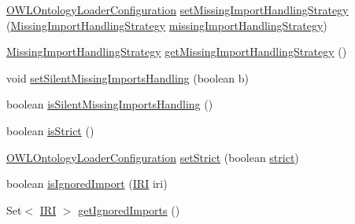 \begin{DoxyCompactItemize}
\item 
\hyperlink{classorg_1_1semanticweb_1_1owlapi_1_1model_1_1_o_w_l_ontology_loader_configuration}{O\-W\-L\-Ontology\-Loader\-Configuration} \hyperlink{classorg_1_1semanticweb_1_1owlapi_1_1model_1_1_o_w_l_ontology_loader_configuration_adfc53f1cb328fdd6aea34edfc6c8e2bf}{set\-Missing\-Import\-Handling\-Strategy} (\hyperlink{enumorg_1_1semanticweb_1_1owlapi_1_1model_1_1_missing_import_handling_strategy}{Missing\-Import\-Handling\-Strategy} \hyperlink{classorg_1_1semanticweb_1_1owlapi_1_1model_1_1_o_w_l_ontology_loader_configuration_a31378553cdc28a0a8143f6eca4579e2d}{missing\-Import\-Handling\-Strategy})
\item 
\hyperlink{enumorg_1_1semanticweb_1_1owlapi_1_1model_1_1_missing_import_handling_strategy}{Missing\-Import\-Handling\-Strategy} \hyperlink{classorg_1_1semanticweb_1_1owlapi_1_1model_1_1_o_w_l_ontology_loader_configuration_a7003306dae1fc02c52871a98acfa1379}{get\-Missing\-Import\-Handling\-Strategy} ()
\item 
void \hyperlink{classorg_1_1semanticweb_1_1owlapi_1_1model_1_1_o_w_l_ontology_loader_configuration_ae1a3e84f9db3f193a781a4cd2154622b}{set\-Silent\-Missing\-Imports\-Handling} (boolean b)
\item 
boolean \hyperlink{classorg_1_1semanticweb_1_1owlapi_1_1model_1_1_o_w_l_ontology_loader_configuration_afbfb9810ba36f03d56b24fc08322d5b9}{is\-Silent\-Missing\-Imports\-Handling} ()
\item 
boolean \hyperlink{classorg_1_1semanticweb_1_1owlapi_1_1model_1_1_o_w_l_ontology_loader_configuration_a8ef20c8accb7989bed5f9ccbb5dd0a3f}{is\-Strict} ()
\item 
\hyperlink{classorg_1_1semanticweb_1_1owlapi_1_1model_1_1_o_w_l_ontology_loader_configuration}{O\-W\-L\-Ontology\-Loader\-Configuration} \hyperlink{classorg_1_1semanticweb_1_1owlapi_1_1model_1_1_o_w_l_ontology_loader_configuration_ad42ff449f6212dda252b4b1329d03388}{set\-Strict} (boolean \hyperlink{classorg_1_1semanticweb_1_1owlapi_1_1model_1_1_o_w_l_ontology_loader_configuration_ac8f2deb760c66c3d3bf620074b74e05b}{strict})
\item 
boolean \hyperlink{classorg_1_1semanticweb_1_1owlapi_1_1model_1_1_o_w_l_ontology_loader_configuration_a8710a1928eb2f7e14429887fc9a1fe93}{is\-Ignored\-Import} (\hyperlink{classorg_1_1semanticweb_1_1owlapi_1_1model_1_1_i_r_i}{I\-R\-I} iri)
\item 
Set$<$ \hyperlink{classorg_1_1semanticweb_1_1owlapi_1_1model_1_1_i_r_i}{I\-R\-I} $>$ \hyperlink{classorg_1_1semanticweb_1_1owlapi_1_1model_1_1_o_w_l_ontology_loader_configuration_aefbd0ba93049254f316ba9ad9e2c4540}{get\-Ignored\-Imports} ()

\end{DoxyCompactItemize}
